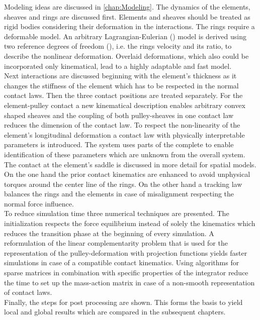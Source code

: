 Modeling ideas are discussed in \cref{chap:Modeling}. 
The dynamics of the elements, sheaves and rings are discussed first. 
Elements and sheaves should be treated as rigid bodies considering their deformation in the interactions.
The rings require a deformable model. 
An arbitrary Lagrangian-Eulerian (\ALE) model is derived using two reference degrees of freedom (\DOFs), i.e. the rings velocity and its ratio, to describe the nonlinear deformation. 
Overlaid deformations, which also could be incorporated only kinematical, lead to a highly adaptable and fast model.\\
Next interactions are discussed beginning with the element's thickness as it changes the stiffness of the element which has to be respected in the normal contact laws.
Then the three contact positions are treated separately. 
For the element-pulley contact a new kinematical description enables arbitrary convex shaped sheaves and the coupling of both pulley-sheaves in one contact law reduces the dimension of the contact law. 
To respect the non-linearity of the element's longitudinal deformation a contact law with physically interpretable parameters is introduced.
The \PFT system uses parts of the complete \CVT to enable identification of these parameters which are unknown from the overall system. 
The contact at the element's saddle is discussed in more detail for spatial models. 
On the one hand the prior contact kinematics are enhanced to avoid unphysical torques around the center line of the rings. 
On the other hand a tracking law  balances the rings and the elements in case of misalignment respecting the normal force influence.\\
To reduce simulation time three numerical techniques are presented. 
The initialization respects the force equilibrium instead of solely the kinematics which reduces the transition phase at the beginning of every simulation. 
A reformulation of the linear complementarity problem that is used for the representation of the pulley-deformation with projection functions yields faster simulations in case of a compatible contact kinematics. 
Using algorithms for sparse matrices in combination with specific properties of the integrator reduce the time to set up the mass-action matrix in case of a non-smooth representation of contact laws.\\
Finally, the steps for post processing are shown. 
This forms the basis to yield local and global results which are compared in the subsequent chapters.\par



